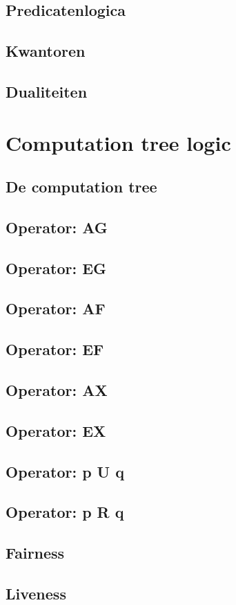 \documentclass{article}
\begin{document}
	\subsection{Predicatenlogica}
	
	\subsection{Kwantoren}
	
	\subsection{Dualiteiten}
	
	\section{Computation tree logic}
	
	\subsection{De computation tree}
	
	\subsection{Operator: AG}
	
	\subsection{Operator: EG}
	
	\subsection{Operator: AF}
	
	\subsection{Operator: EF}
	
	\subsection{Operator: AX}
	
	\subsection{Operator: EX}
	
	\subsection{Operator: p U q}
	
	\subsection{Operator: p R q}
	
	\subsection{Fairness}
	
	\subsection{Liveness}
	
	\newpage
	
	\newpage
	
	
\end{document}
